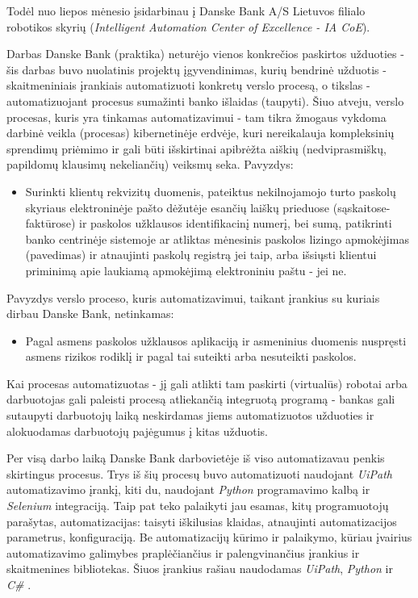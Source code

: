 \documentclass{VUMIFPSBakPrakAt}
\begin{document}
\vspace{10pt}
\par
Todėl nuo liepos mėnesio įsidarbinau į Danske Bank A/S Lietuvos filialo robotikos skyrių (\textit{Intelligent Automation Center of Excellence - IA CoE}). 
\par
Darbas Danske Bank (praktika) neturėjo vienos konkrečios paskirtos užduoties - šis darbas buvo nuolatinis projektų įgyvendinimas, kurių bendrinė užduotis - skaitmeniniais įrankiais automatizuoti konkretų verslo procesą, o tikslas - automatizuojant procesus sumažinti banko išlaidas (taupyti). Šiuo atveju, verslo procesas, kuris yra tinkamas automatizavimui - tam tikra žmogaus vykdoma darbinė veikla (procesas) kibernetinėje erdvėje, kuri nereikalauja kompleksinių sprendimų priėmimo ir gali būti išskirtinai apibrėžta aiškių (nedviprasmiškų, papildomų klausimų nekeliančių) veiksmų seka. Pavyzdys:
\vspace{10pt}
\begin{itemize}
    \item Surinkti klientų rekvizitų duomenis, pateiktus nekilnojamojo turto paskolų skyriaus elektroninėje pašto dėžutėje esančių laiškų prieduose (sąskaitose-faktūrose) ir paskolos užklausos identifikacinį numerį, bei sumą, patikrinti banko centrinėje sistemoje ar atliktas mėnesinis paskolos lizingo apmokėjimas (pavedimas) ir atnaujinti paskolų registrą jei taip, arba išsiųsti klientui priminimą apie laukiamą apmokėjimą elektroniniu paštu - jei ne.
\end{itemize}
\vspace{10pt}
\par
Pavyzdys verslo proceso, kuris automatizavimui, taikant įrankius su kuriais dirbau Danske Bank, netinkamas:
\vspace{10pt}
\begin{itemize}
    \item Pagal asmens paskolos užklausos aplikaciją ir asmeninius duomenis nuspręsti asmens rizikos rodiklį ir pagal tai suteikti arba nesuteikti paskolos.
\end{itemize}
\vspace{10pt}
\par
Kai procesas automatizuotas - jį gali atlikti tam paskirti (virtualūs) robotai arba darbuotojas gali paleisti procesą atliekančią integruotą programą - bankas gali sutaupyti darbuotojų laiką neskirdamas jiems automatizuotos užduoties ir alokuodamas darbuotojų pajėgumus į kitas užduotis.
\par
Per visą darbo laiką Danske Bank darbovietėje iš viso automatizavau penkis skirtingus procesus. Trys iš šių procesų buvo automatizuoti naudojant \textit{UiPath} automatizavimo įrankį, kiti du, naudojant \textit{Python} programavimo kalbą ir \textit{Selenium} \cite{selenium} integraciją. Taip pat teko palaikyti jau esamas, kitų programuotojų parašytas, automatizacijas: taisyti iškilusias klaidas, atnaujinti automatizacijos parametrus, konfiguraciją. Be automatizacijų kūrimo ir palaikymo, kūriau įvairius automatizavimo galimybes praplėčiančius ir palengvinančius įrankius ir skaitmenines bibliotekas. Šiuos įrankius rašiau naudodamas \textit{UiPath}, \textit{Python} ir \textit{C\#} \cite{uipath,python2021python,csharp}.
\end{document}

